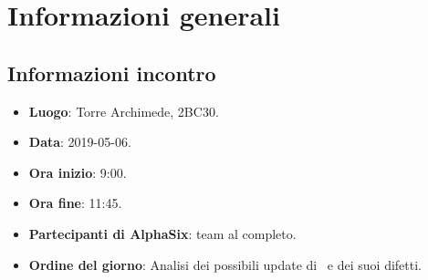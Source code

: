 \newcommand{\documento}{\VI}
\newcommand{\nomedocumentofisico}{VI\_2019-05-6.pdf}
\newcommand{\redazione}{\NC}
\newcommand{\verifica}{\SG}
\newcommand{\approvazione}{\TG}
\newcommand{\versione}{1.0.0}
\newcommand{\uso}{Interno}
\newcommand{\destinateTo}{\gruppo}
\newcommand{\datacreazione}{6 maggio 2019}
\newcommand{\datamodifica}{8 maggio 2019}
\newcommand{\stato}{Approvato}

\def\TABELLE{false}	%
\def\FIGURE{false} 	%






    

    

    \section{Informazioni generali}
		\subsection{Informazioni incontro}
			\begin{itemize}
				\item \textbf{Luogo}: Torre Archimede, 2BC30.
				\item \textbf{Data}: 2019-05-06.
				\item \textbf{Ora inizio}: 9:00.
				\item \textbf{Ora fine}: 11:45.
				\item \textbf{Partecipanti di AlphaSix}: team al completo.
				\item \textbf{Ordine del giorno}: Analisi dei possibili update di \progetto\ e dei suoi difetti.
			\end{itemize}

